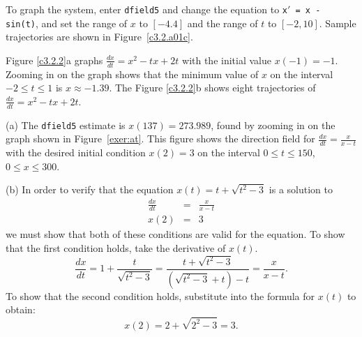 \documentclass{ximera}
\begin{document}
\begin{figure}[htb]
                       \centerline{%
                       }
\end{figure}

To graph the system, enter {\tt dfield5} and change the equation to
{\tt x$'$ = x - sin(t)}, and set the range of $x$ to $[-4.4]$ and the
range of $t$ to $[-2,10]$.  Sample trajectories are shown in
Figure~\ref{c3.2.a01c}.

\begin{figure}[htb]
                       \centerline{%
                       }
\end{figure}

Figure \ref{c3.2.2}a graphs $\frac{dx}{dt} = x^2 -tx +2t$ with the
initial value $x(-1) = -1$.  Zooming in on the graph shows that the
minimum value of $x$ on the interval $-2 \leq t \leq 1$ is $x \approx
-1.39$.  The Figure \ref{c3.2.2}b shows eight trajectories of
$\frac{dx}{dt} = x^2 -tx +2t$.

\begin{figure}[htb]
                       \centerline{%
                       }
\end{figure}

(a) The {\tt dfield5} estimate is $x(137) = 273.989$, found by zooming
in on the graph shown in Figure~\ref{exer:at}.  This figure shows the
direction field for $\frac{dx}{dt} = \frac{x}{x - t}$ with the desired
initial condition $x(2) = 3$ on the interval $0 \leq t \leq 150$, $0
\leq x \leq 300$.

(b) In order to verify that the equation $x(t) = t + \sqrt{t^2 - 3}$
is a solution to
\[
\begin{array}{rcl}
\frac{dx}{dt} & = & \frac{x}{x - t} \\
x(2) & = & 3\end{array}
\]
we must show that both of these conditions are valid for the equation.
To show that the first condition holds, take the derivative of $x(t)$.
\[
\frac{dx}{dt} = 1 + \frac{t}{\sqrt{t^2 - 3}} = \frac{t + {\sqrt{t^2 - 
3}}}{\left({\sqrt{t^2 - 3}} + t\right) - t} = \frac{x}{x - t}.
\]
To show that the second condition holds, substitute into the formula for
$x(t)$ to obtain:
\[ x(2) = 2 + \sqrt{2^2 - 3} = 3. \]
\end{document}

